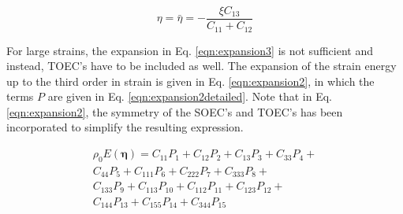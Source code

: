 \documentclass[showpacs,aps,floatfix,prb,reprint,superscriptaddress]{revtex4-1}
\begin{document}
\begin{equation}
\label{eqn:eqstr1} 
\eta = \bar{\eta} = -\frac{\xi C_{13}}{C_{11} + C_{12}}
\end{equation}

For large strains, the expansion in Eq. \ref{eqn:expansion3} is not sufficient and instead, TOEC's have to be included as well. The expansion of the strain energy up to the third order in strain is given in Eq. \ref{eqn:expansion2}, in which the terms $P$ are given in Eq. \ref{eqn:expansion2detailed}. Note that in Eq. \ref{eqn:expansion2}, the symmetry of the SOEC's and TOEC's has been incorporated to simplify the resulting expression. 

\begin{multline}
\label{eqn:expansion2} 
\rho_{0} E \left(\bm{\eta}\right) = C_{11} P_{1} +  C_{12} P_{2} + C_{13} P_{3} + C_{33} P_{4} + \\ C_{44} P_{5} + C_{111} P_{6} + C_{222} P_{7} + C_{333} P_{8} + \\ C_{133} P_{9} +  C_{113} P_{10} + C_{112} P_{11} + C_{123} P_{12} + \\ C_{144} P_{13} + C_{155} P_{14} + C_{344} P_{15}
\end{multline}
\end{document}

